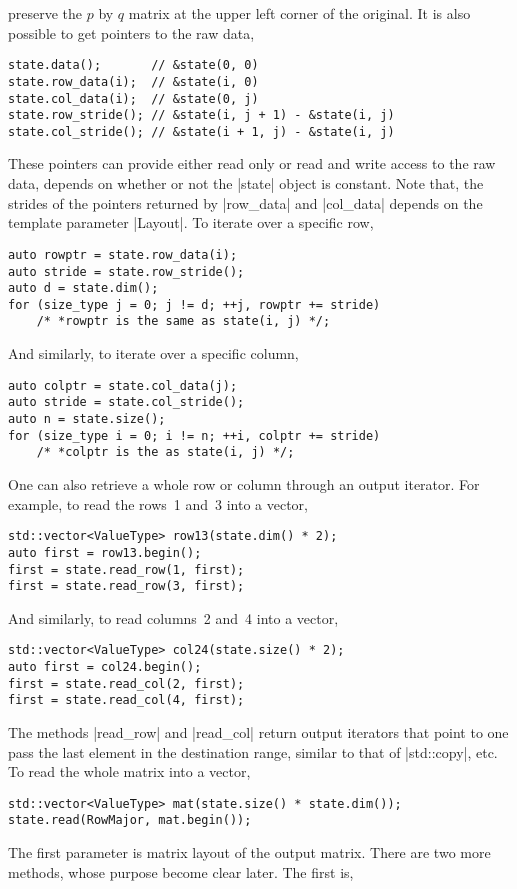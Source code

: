 preserve the $p$ by $q$ matrix at the upper left corner of the original. It is
also possible to get pointers to the raw data,
\begin{verbatim}
state.data();       // &state(0, 0)
state.row_data(i);  // &state(i, 0)
state.col_data(i);  // &state(0, j)
state.row_stride(); // &state(i, j + 1) - &state(i, j)
state.col_stride(); // &state(i + 1, j) - &state(i, j)
\end{verbatim}
These pointers can provide either read only or read and write access to the raw
data, depends on whether or not the |state| object is constant. Note that, the
strides of the pointers returned by |row_data| and |col_data| depends on the
template parameter |Layout|. To iterate over a specific row,
\begin{verbatim}
auto rowptr = state.row_data(i);
auto stride = state.row_stride();
auto d = state.dim();
for (size_type j = 0; j != d; ++j, rowptr += stride)
    /* *rowptr is the same as state(i, j) */;
\end{verbatim}
And similarly, to iterate over a specific column,
\begin{verbatim}
auto colptr = state.col_data(j);
auto stride = state.col_stride();
auto n = state.size();
for (size_type i = 0; i != n; ++i, colptr += stride)
    /* *colptr is the as state(i, j) */;
\end{verbatim}
One can also retrieve a whole row or column through an output iterator. For
example, to read the rows~1 and~3 into a vector,
\begin{verbatim}
std::vector<ValueType> row13(state.dim() * 2);
auto first = row13.begin();
first = state.read_row(1, first);
first = state.read_row(3, first);
\end{verbatim}
And similarly, to read columns~2 and~4 into a vector,
\begin{verbatim}
std::vector<ValueType> col24(state.size() * 2);
auto first = col24.begin();
first = state.read_col(2, first);
first = state.read_col(4, first);
\end{verbatim}
The methods |read_row| and |read_col| return output iterators that point to one
pass the last element in the destination range, similar to that of |std::copy|,
etc. To read the whole matrix into a vector,
\begin{verbatim}
std::vector<ValueType> mat(state.size() * state.dim());
state.read(RowMajor, mat.begin());
\end{verbatim}
The first parameter is matrix layout of the output matrix. There are two more
methods, whose purpose become clear later. The first is,
